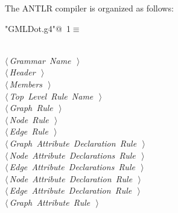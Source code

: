 \documentclass[a4paper]{report}
\begin{document}
The ANTLR compiler is organized as follows: 
\begin{flushleft} \small
\begin{minipage}{\linewidth}\label{scrap1}\raggedright\small
{} \verb@"GMLDot.g4"@\nobreak\ {\footnotesize {1}}$\equiv$
\vspace{-1ex}
\begin{list}{}{} \item
\mbox{}\verb@@\\
\mbox{}\verb@@\hbox{$\langle\,${\itshape Grammar Name}\nobreak\ {\footnotesize {}}$\,\rangle$}\verb@@\\
\mbox{}\verb@@\hbox{$\langle\,${\itshape Header}\nobreak\ {\footnotesize {}}$\,\rangle$}\verb@@\\
\mbox{}\verb@@\hbox{$\langle\,${\itshape Members}\nobreak\ {\footnotesize {}}$\,\rangle$}\verb@@\\
\mbox{}\verb@@\hbox{$\langle\,${\itshape Top Level Rule Name}\nobreak\ {\footnotesize {}}$\,\rangle$}\verb@@\\
\mbox{}\verb@@\hbox{$\langle\,${\itshape Graph Rule}\nobreak\ {\footnotesize {}}$\,\rangle$}\verb@@\\
\mbox{}\verb@@\hbox{$\langle\,${\itshape Node Rule}\nobreak\ {\footnotesize {}}$\,\rangle$}\verb@@\\
\mbox{}\verb@@\hbox{$\langle\,${\itshape Edge Rule}\nobreak\ {\footnotesize {}}$\,\rangle$}\verb@@\\
\mbox{}\verb@@\hbox{$\langle\,${\itshape Graph Attribute Declaration Rule}\nobreak\ {\footnotesize {}}$\,\rangle$}\verb@@\\
\mbox{}\verb@@\hbox{$\langle\,${\itshape Node Attribute Declarations Rule}\nobreak\ {\footnotesize {}}$\,\rangle$}\verb@@\\
\mbox{}\verb@@\hbox{$\langle\,${\itshape Edge Attribute Declarations Rule}\nobreak\ {\footnotesize {}}$\,\rangle$}\verb@@\\
\mbox{}\verb@@\hbox{$\langle\,${\itshape Node Attribute Declaration Rule}\nobreak\ {\footnotesize {}}$\,\rangle$}\verb@@\\
\mbox{}\verb@@\hbox{$\langle\,${\itshape Edge Attribute Declaration Rule}\nobreak\ {\footnotesize {}}$\,\rangle$}\verb@@\\
\mbox{}\verb@@\hbox{$\langle\,${\itshape Graph Attribute Rule}\nobreak\ {\footnotesize {}}$\,\rangle$}\verb@@\\

\end{list}
\end{minipage}
\end{flushleft}
\end{document}
